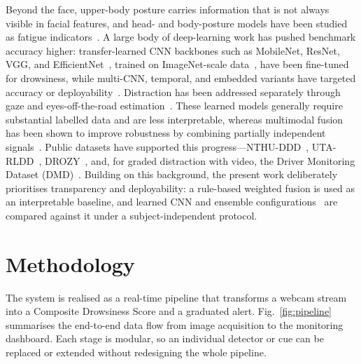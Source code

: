 \documentclass[conference]{IEEEtran}
\begin{document}
Beyond the face, upper-body posture carries information that is not always visible in facial features, and head- and body-posture models have been studied as fatigue indicators~\cite{ansari}. A large body of deep-learning work has pushed benchmark accuracy higher: transfer-learned CNN backbones such as MobileNet, ResNet, VGG, and EfficientNet~\cite{howard,sandler,he_resnet,simonyan,tan_efficientnet}, trained on ImageNet-scale data~\cite{krizhevsky,deng_imagenet}, have been fine-tuned for drowsiness, while multi-CNN, temporal, and embedded variants have targeted accuracy or deployability~\cite{ahmed,weng,florez,albadawi}. Distraction has been addressed separately through gaze and eyes-off-the-road estimation~\cite{zhang_gaze}. These learned models generally require substantial labelled data and are less interpretable, whereas multimodal fusion has been shown to improve robustness by combining partially independent signals~\cite{du}. Public datasets have supported this progress---NTHU-DDD~\cite{weng}, UTA-RLDD~\cite{ghoddoosian}, DROZY~\cite{massoz_drozy}, and, for graded distraction with video, the Driver Monitoring Dataset (DMD)~\cite{ortega_dmd}. Building on this background, the present work deliberately prioritises transparency and deployability: a rule-based weighted fusion is used as an interpretable baseline, and learned CNN and ensemble configurations~\cite{sandler,chen_xgboost} are compared against it under a subject-independent protocol.

\section{Methodology}
The system is realised as a real-time pipeline that transforms a webcam stream into a Composite Drowsiness Score and a graduated alert. Fig.~\ref{fig:pipeline} summarises the end-to-end data flow from image acquisition to the monitoring dashboard. Each stage is modular, so an individual detector or cue can be replaced or extended without redesigning the whole pipeline.
\end{document}
